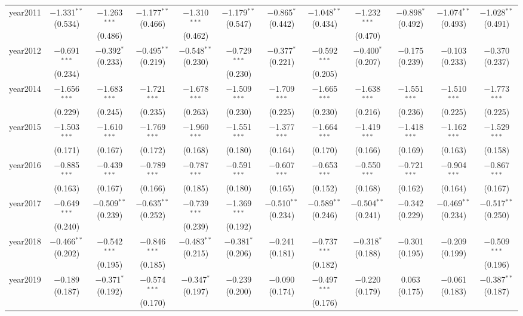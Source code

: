 \begin{table}[!htbp]
\begin{tabular}{@{\extracolsep{1pt}}lccccccccccc}
  year2011 & $-$1.331$^{**}$ (0.534) & $-$1.263$^{***}$ (0.486) & $-$1.177$^{**}$ (0.466) & $-$1.310$^{***}$ (0.462) & $-$1.179$^{**}$ (0.547) & $-$0.865$^{*}$ (0.442) & $-$1.048$^{**}$ (0.434) & $-$1.232$^{***}$ (0.470) & $-$0.898$^{*}$ (0.492) & $-$1.074$^{**}$ (0.493) & $-$1.028$^{**}$ (0.491) \\ 
  year2012 & $-$0.691$^{***}$ (0.234) & $-$0.392$^{*}$ (0.233) & $-$0.495$^{**}$ (0.219) & $-$0.548$^{**}$ (0.230) & $-$0.729$^{***}$ (0.230) & $-$0.377$^{*}$ (0.221) & $-$0.592$^{***}$ (0.205) & $-$0.400$^{*}$ (0.207) & $-$0.175 (0.239) & $-$0.103 (0.233) & $-$0.370 (0.237) \\ 
  year2014 & $-$1.656$^{***}$ (0.229) & $-$1.683$^{***}$ (0.245) & $-$1.721$^{***}$ (0.235) & $-$1.678$^{***}$ (0.263) & $-$1.509$^{***}$ (0.230) & $-$1.709$^{***}$ (0.225) & $-$1.665$^{***}$ (0.230) & $-$1.638$^{***}$ (0.216) & $-$1.551$^{***}$ (0.236) & $-$1.510$^{***}$ (0.225) & $-$1.773$^{***}$ (0.225) \\ 
  year2015 & $-$1.503$^{***}$ (0.171) & $-$1.610$^{***}$ (0.167) & $-$1.769$^{***}$ (0.172) & $-$1.960$^{***}$ (0.168) & $-$1.551$^{***}$ (0.180) & $-$1.377$^{***}$ (0.164) & $-$1.664$^{***}$ (0.170) & $-$1.419$^{***}$ (0.166) & $-$1.418$^{***}$ (0.169) & $-$1.162$^{***}$ (0.163) & $-$1.529$^{***}$ (0.158) \\ 
  year2016 & $-$0.885$^{***}$ (0.163) & $-$0.439$^{***}$ (0.167) & $-$0.789$^{***}$ (0.166) & $-$0.787$^{***}$ (0.185) & $-$0.591$^{***}$ (0.180) & $-$0.607$^{***}$ (0.165) & $-$0.653$^{***}$ (0.152) & $-$0.550$^{***}$ (0.168) & $-$0.721$^{***}$ (0.162) & $-$0.904$^{***}$ (0.164) & $-$0.867$^{***}$ (0.167) \\ 
  year2017 & $-$0.649$^{***}$ (0.240) & $-$0.509$^{**}$ (0.239) & $-$0.635$^{**}$ (0.252) & $-$0.739$^{***}$ (0.239) & $-$1.369$^{***}$ (0.192) & $-$0.510$^{**}$ (0.234) & $-$0.589$^{**}$ (0.246) & $-$0.504$^{**}$ (0.241) & $-$0.342 (0.229) & $-$0.469$^{**}$ (0.234) & $-$0.517$^{**}$ (0.250) \\ 
  year2018 & $-$0.466$^{**}$ (0.202) & $-$0.542$^{***}$ (0.195) & $-$0.846$^{***}$ (0.185) & $-$0.483$^{**}$ (0.215) & $-$0.381$^{*}$ (0.206) & $-$0.241 (0.181) & $-$0.737$^{***}$ (0.182) & $-$0.318$^{*}$ (0.188) & $-$0.301 (0.195) & $-$0.209 (0.199) & $-$0.509$^{***}$ (0.196) \\ 
  year2019 & $-$0.189 (0.187) & $-$0.371$^{*}$ (0.192) & $-$0.574$^{***}$ (0.170) & $-$0.347$^{*}$ (0.197) & $-$0.239 (0.200) & $-$0.090 (0.174) & $-$0.497$^{***}$ (0.176) & $-$0.220 (0.179) & 0.063 (0.175) & $-$0.061 (0.183) & $-$0.387$^{**}$ (0.187) \\ 

\end{tabular}
\end{table}
